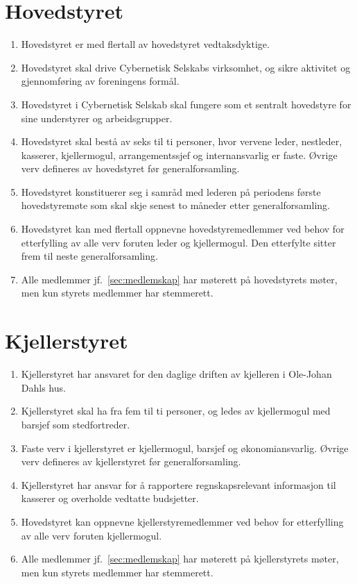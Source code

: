 \documentclass[8pt,norsk,a4paper]{article}
\begin{document}
\section{Hovedstyret}
\begin{enumerate}
	\item{Hovedstyret er med  flertall av hovedstyret vedtaksdyktige.}
	\item{Hovedstyret skal drive Cybernetisk Selskabs virksomhet, og sikre aktivitet og gjennomføring av foreningens formål.}
	\item{Hovedstyret i Cybernetisk Selskab skal fungere som et sentralt hovedstyre for sine understyrer og arbeidsgrupper.}
	\item{Hovedstyret skal bestå av seks til ti personer, hvor vervene leder, nestleder, kasserer, kjellermogul, arrangementssjef og internansvarlig er faste. Øvrige verv defineres av hovedstyret før generalforsamling.\label{sec:hs-antall}}
	\item{Hovedstyret konstituerer seg i samråd med lederen på periodens første hovedstyremøte som skal skje senest to måneder etter generalforsamling.}
	\item{Hovedstyret kan med  flertall oppnevne hovedstyremedlemmer ved behov for etterfylling av alle verv foruten leder og kjellermogul. Den etterfylte sitter frem til neste generalforsamling.} 
	\item{Alle medlemmer jf.~\ref{sec:medlemskap} har møterett på hovedstyrets møter, men kun styrets medlemmer har stemmerett.}
\end{enumerate}

\section{Kjellerstyret}
\begin{enumerate}
	\item{Kjellerstyret har ansvaret for den daglige driften av kjelleren i Ole-Johan Dahls hus.}
	\item{Kjellerstyret skal ha fra fem til ti personer, og ledes av kjellermogul med barsjef som stedfortreder.}
	\item{Faste verv i kjellerstyret er kjellermogul, barsjef og økonomiansvarlig. Øvrige verv defineres av kjellerstyret før generalforsamling.}
	\item{Kjellerstyret har ansvar for å rapportere regnskapsrelevant informasjon til kasserer og overholde vedtatte budsjetter.}
	\item{Hovedstyret kan oppnevne kjellerstyremedlemmer ved behov for etterfylling av alle verv foruten kjellermogul.}
 	\item{Alle medlemmer jf.~\ref{sec:medlemskap} har møterett på kjellerstyrets møter, men kun styrets medlemmer har stemmerett.}
\end{enumerate}
\end{document}
